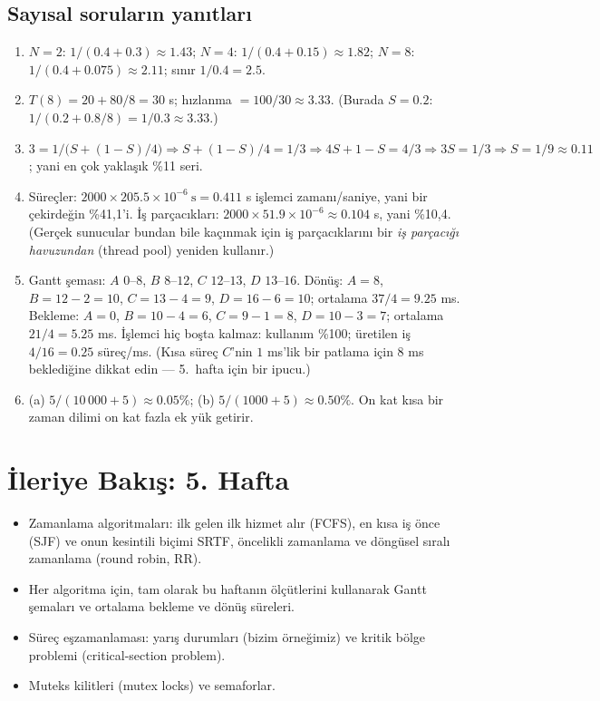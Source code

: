 \subsection*{Sayısal soruların yanıtları}
\begin{enumerate}[leftmargin=1.6em,start=13]
  \item $N=2$: $1/(0.4 + 0.3) \approx 1.43$; $N=4$: $1/(0.4 + 0.15) \approx 1.82$; $N=8$: $1/(0.4 + 0.075) \approx 2.11$; sınır $1/0.4 = 2.5$.
  \item $T(8) = 20 + 80/8 = 30$ s; hızlanma $= 100/30 \approx 3.33$. (Burada $S = 0.2$: $1/(0.2 + 0.8/8) = 1/0.3 \approx 3.33$.)
  \item $3 = 1/\bigl(S + (1-S)/4\bigr) \Rightarrow S + (1-S)/4 = 1/3 \Rightarrow 4S + 1 - S = 4/3 \Rightarrow 3S = 1/3 \Rightarrow S = 1/9 \approx 0.11$; yani en çok yaklaşık \%11 seri.
  \item Süreçler: $2000 \times 205.5\times10^{-6}\ \text{s} = 0.411$ s işlemci zamanı/saniye, yani bir çekirdeğin \%41,1'i. İş parçacıkları: $2000 \times 51.9\times10^{-6} \approx 0.104$ s, yani \%10,4. (Gerçek sunucular bundan bile kaçınmak için iş parçacıklarını bir \emph{iş parçacığı havuzundan} (thread pool) yeniden kullanır.)
  \item Gantt şeması: $A$ $0$--$8$, $B$ $8$--$12$, $C$ $12$--$13$, $D$ $13$--$16$. Dönüş: $A = 8$, $B = 12-2 = 10$, $C = 13-4 = 9$, $D = 16-6 = 10$; ortalama $37/4 = 9.25$ ms. Bekleme: $A = 0$, $B = 10-4 = 6$, $C = 9-1 = 8$, $D = 10-3 = 7$; ortalama $21/4 = 5.25$ ms. İşlemci hiç boşta kalmaz: kullanım \%100; üretilen iş $4/16 = 0.25$ süreç/ms. (Kısa süreç $C$'nin $1$ ms'lik bir patlama için $8$ ms beklediğine dikkat edin --- 5.~hafta için bir ipucu.)
  \item (a) $5/(10\,000 + 5) \approx 0.05\%$; (b) $5/(1000 + 5) \approx 0.50\%$. On kat kısa bir zaman dilimi on kat fazla ek yük getirir.
\end{enumerate}

\section{İleriye Bakış: 5. Hafta}

\begin{itemize}
  \item Zamanlama algoritmaları: ilk gelen ilk hizmet alır (FCFS), en kısa iş önce (SJF) ve onun kesintili biçimi SRTF, öncelikli zamanlama ve döngüsel sıralı zamanlama (round robin, RR).
  \item Her algoritma için, tam olarak bu haftanın ölçütlerini kullanarak Gantt şemaları ve ortalama bekleme ve dönüş süreleri.
  \item Süreç eşzamanlaması: yarış durumları (bizim  örneğimiz) ve kritik bölge problemi (critical-section problem).
  \item Muteks kilitleri (mutex locks) ve semaforlar.
\end{itemize}

